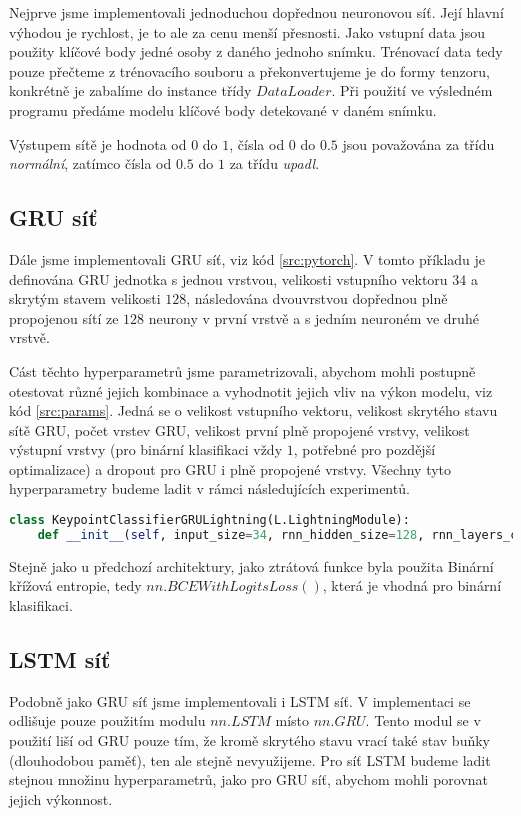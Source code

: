 Nejprve jsme implementovali jednoduchou dopřednou neuronovou síť. Její hlavní
výhodou je rychlost, je to ale za cenu menší přesnosti. Jako vstupní data jsou
použity klíčové body jedné osoby z daného jednoho snímku. Trénovací data tedy
pouze přečteme z trénovacího souboru a překonvertujeme je do formy tenzoru,
konkrétně je zabalíme do instance třídy $DataLoader$. Při použití ve výsledném
programu předáme modelu klíčové body detekované v daném snímku.


Výstupem sítě je hodnota od $0$ do $1$, čísla od $0$ do $0.5$ jsou považována
za třídu \textit{normální}, zatímco čísla od $0.5$ do $1$ za třídu
\textit{upadl}.

\subsection{GRU síť}

Dále jsme implementovali GRU síť, viz kód \ref{src:pytorch}. V tomto příkladu
je definována GRU jednotka s jednou vrstvou, velikosti vstupního vektoru $34$ a
skrytým stavem velikosti $128$, následována dvouvrstvou dopřednou plně
propojenou sítí ze $128$ neurony v první vrstvě a s jedním neuroném ve druhé
vrstvě.

Cást těchto hyperparametrů jsme parametrizovali, abychom mohli postupně
otestovat různé jejich kombinace a vyhodnotit jejich vliv na výkon modelu, viz
kód \ref{src:params}. Jedná se o velikost vstupního vektoru, velikost skrytého
stavu sítě GRU, počet vrstev GRU, velikost první plně propojené vrstvy,
velikost výstupní vrstvy (pro binární klasifikaci vždy $1$, potřebné pro
pozdější optimalizace) a dropout pro GRU i plně propojené vrstvy. Všechny tyto
hyperparametry budeme ladit v rámci následujících experimentů.

\begin{lstlisting}[language=Python, label=src:params, caption={Parametry konstruktoru třídy $KeypointClassifierGRU$ definující hyperparametry sítě}]
class KeypointClassifierGRULightning(L.LightningModule):
    def __init__(self, input_size=34, rnn_hidden_size=128, rnn_layers_count=2, fc_size=128, output_size=1, rnn_dropout=0.3, fc_dropout=0.3, device=None):
\end{lstlisting}

Stejně jako u předchozí architektury, jako ztrátová funkce byla použita Binární
křížová entropie, tedy $nn.BCEWithLogitsLoss()$, která je vhodná pro binární
klasifikaci.

\subsection{LSTM síť}

Podobně jako GRU síť jsme implementovali i LSTM síť. V implementaci se odlišuje
pouze použitím modulu $nn.LSTM$ místo $nn.GRU$. Tento modul se v použití liší
od GRU pouze tím, že kromě skrytého stavu vrací také stav buňky (dlouhodobou
paměť), ten ale stejně nevyužijeme. Pro síť LSTM budeme ladit stejnou množinu
hyperparametrů, jako pro GRU síť, abychom mohli porovnat jejich výkonnost.

\endinput
